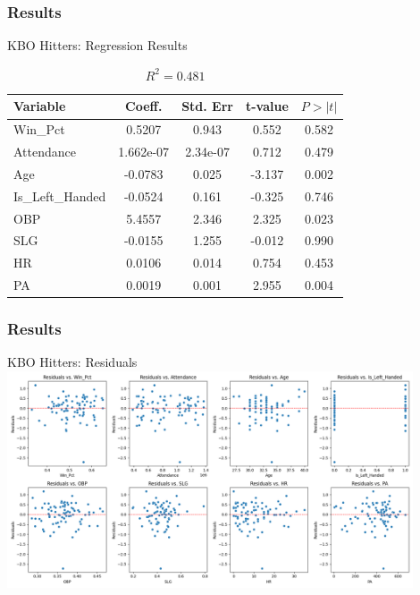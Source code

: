 \documentclass[9pt]{beamer}
\begin{document}
\begin{frame}
    \frametitle{Results}
    \begin{block}{KBO Hitters: Regression Results}
        \begin{table}[ht]
            \centering
            \caption{ \( R^2 = 0.481 \)}
            \begin{tabular}{lcccc}
            \toprule
            Variable & Coeff. & Std. Err & t-value & $P > |t|$ \\
            \midrule
            Win\_Pct & 0.5207 & 0.943 & 0.552 & 0.582 \\
            Attendance & 1.662e-07 & 2.34e-07 & 0.712 & 0.479 \\
            \rowcolor{red!20} Age & -0.0783 & 0.025 & -3.137 & 0.002 \\
            Is\_Left\_Handed & -0.0524 & 0.161 & -0.325 & 0.746 \\
            \rowcolor{red!20} OBP & 5.4557 & 2.346 & 2.325 & 0.023 \\
            SLG & -0.0155 & 1.255 & -0.012 & 0.990 \\
            HR & 0.0106 & 0.014 & 0.754 & 0.453 \\
            \rowcolor{red!20} PA & 0.0019 & 0.001 & 2.955 & 0.004 \\
            \bottomrule
            \end{tabular}
        \end{table}        
    \end{block}
\end{frame}

\begin{frame}
    \frametitle{Results}
    \begin{block}{KBO Hitters: Residuals}
        \centering
        \includegraphics[width=0.9\textwidth,keepaspectratio]{images/kbo_hitters_residuals.png}
    \end{block}
\end{frame}
\end{document}
